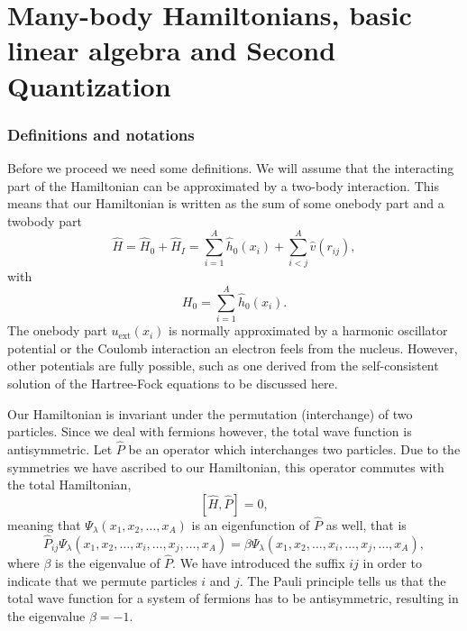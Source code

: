 

\chapter{Many-body Hamiltonians, basic linear algebra and Second Quantization}

\subsection*{Definitions and notations}

Before we proceed we need some definitions.
We will assume that the interacting part of the Hamiltonian
can be approximated by a two-body interaction.
This means that our Hamiltonian is written as the sum of some onebody part and a twobody part
\begin{equation}
    \hat{H} = \hat{H}_0 + \hat{H}_I 
    = \sum_{i=1}^A \hat{h}_0(x_i) + \sum_{i < j}^A \hat{v}(r_{ij}),
\label{Hnuclei}
\end{equation}
with 
\begin{equation}
  H_0=\sum_{i=1}^A \hat{h}_0(x_i).
\label{hinuclei}
\end{equation}
The onebody part $u_{\mathrm{ext}}(x_i)$ is normally approximated by a harmonic oscillator potential or the Coulomb interaction an electron feels from the nucleus. However, other potentials are fully possible, such as 
one derived from the self-consistent solution of the Hartree-Fock equations to be discussed here.

Our Hamiltonian is invariant under the permutation (interchange) of two particles.
Since we deal with fermions however, the total wave function is antisymmetric.
Let $\hat{P}$ be an operator which interchanges two particles.
Due to the symmetries we have ascribed to our Hamiltonian, this operator commutes with the total Hamiltonian,
\[
[\hat{H},\hat{P}] = 0,
 \]
meaning that $\Psi_{\lambda}(x_1, x_2, \dots , x_A)$ is an eigenfunction of 
$\hat{P}$ as well, that is
\[
\hat{P}_{ij}\Psi_{\lambda}(x_1, x_2, \dots,x_i,\dots,x_j,\dots,x_A)=
\beta\Psi_{\lambda}(x_1, x_2, \dots,x_i,\dots,x_j,\dots,x_A),
\]
where $\beta$ is the eigenvalue of $\hat{P}$. We have introduced the suffix $ij$ in order to indicate that we permute particles $i$ and $j$.
The Pauli principle tells us that the total wave function for a system of fermions
has to be antisymmetric, resulting in the eigenvalue $\beta = -1$.   

